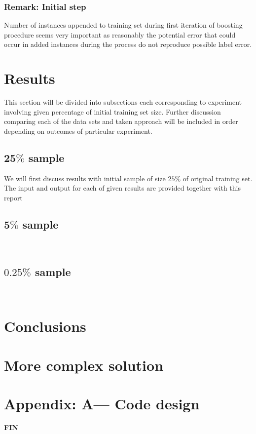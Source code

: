 \documentclass[12pt, a4paper, pdflatex]{report}
\begin{document}
\subsubsection{Remark: Initial step}
Number of instances appended to training set during first iteration of boosting procedure seems very important as reasonably the potential error that could occur in added instances during the process do not reproduce possible label error.


\section{Results}
This section will be divided into subsections each corresponding to experiment involving given percentage of initial training set size. Further discussion comparing each of the data sets and taken approach will be included in order depending on outcomes of particular experiment.

\subsection{$\mathbf{25\%}$ sample}
We will first discuss results with initial sample of size $25\%$ of original training set. The input and output for each of given results are provided together with this report~\cite{results25}


\subsection{$\mathbf{5\%}$ sample}
\lipsum[1]~\cite{results5}


\subsection{$\mathbf{0.25\%}$ sample}
\lipsum[1]~\cite{results025}

\section{Conclusions}
\lipsum[1]

\section{More complex solution}
\lipsum[1]





\newpage
\section*{Appendix: A--- Code design\label{ap:code}}



\newpage
\begin{center} \vspace*{5cm}\textbf{\huge FIN}\vspace*{5cm} \end{center}


{}
\end{document}
